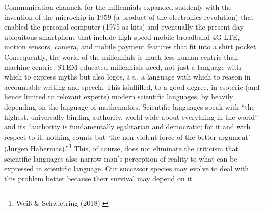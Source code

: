 \begin{multicols}{2}
Communication channels for the millennials expanded suddenly with the invention of the microchip in 1959 (a product of the electronics revolution) that enabled the personal computer (1975 as kits) and eventually the present day ubiquitous smartphone that include high-speed mobile broadband 4G LTE, motion sensors, camera, and mobile payment features that fit into a shirt pocket. Consequently, the world of the millennials is much less human-centric than machine-centric. STEM educated millennials need, not just a language with which to express myths but also logos, \textit{i.e.,} a language with which to reason in accountable writing and speech. This is\break fulfilled, to a good degree, in esoteric (and hence limited to relevant experts) modern scientific languages, by heavily depending on the language of mathematics. Scientific languages speak with “the highest, universally binding authority, world-wide about everything in the world” and its “authority is fundamentally egalitarian and democratic; for it and with respect to it, nothing counts but ‘the non-violent force of the better argument’ (Jürgen Habermas).”\footnote{Weiß \& Schwietring (2018).}  This, of course, does not eliminate the criticism that scientific languages also narrow man's perception of reality to what can be expressed in scientific language. Our successor species may evolve to deal with this problem better because their survival may depend on it. 


\end{multicols}
